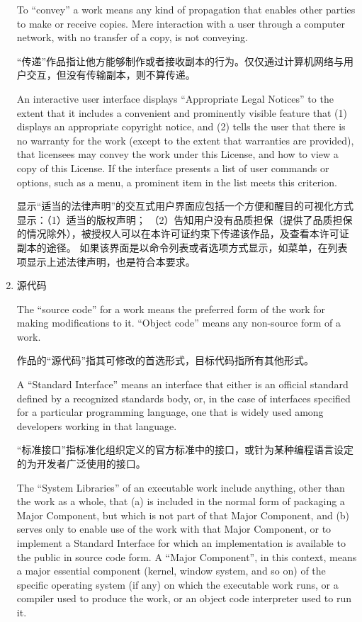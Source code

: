 \documentclass[11pt]{article}
\begin{document}
\begin{enumerate}
        To ``convey'' a work means any kind of propagation that enables other
        parties to make or receive copies.  Mere interaction with a user through
        a computer network, with no transfer of a copy, is not conveying.

        “传递”作品指让他方能够制作或者接收副本的行为。仅仅通过计算机网络与用户交互，但没有传输副本，则不算传递。

        An interactive user interface displays ``Appropriate Legal Notices''
        to the extent that it includes a convenient and prominently visible
        feature that (1) displays an appropriate copyright notice, and (2)
        tells the user that there is no warranty for the work (except to the
        extent that warranties are provided), that licensees may convey the
        work under this License, and how to view a copy of this License.  If
        the interface presents a list of user commands or options, such as a
        menu, a prominent item in the list meets this criterion.

        显示“适当的法律声明”的交互式用户界面应包括一个方便和醒目的可视化方式显示：（1）适当的版权声明；
        （2）告知用户没有品质担保（提供了品质担保的情况除外），被授权人可以在本许可证约束下传递该作品，及查看本许可证副本的途径。
        如果该界面是以命令列表或者选项方式显示，如菜单，在列表项显示上述法律声明，也是符合本要求。


  \item 源代码

        The ``source code'' for a work means the preferred form of the work
        for making modifications to it.  ``Object code'' means any non-source
        form of a work.

        作品的“源代码”指其可修改的首选形式，目标代码指所有其他形式。

        A ``Standard Interface'' means an interface that either is an official
        standard defined by a recognized standards body, or, in the case of
        interfaces specified for a particular programming language, one that
        is widely used among developers working in that language.

        “标准接口”指标准化组织定义的官方标准中的接口，或针为某种编程语言设定的为开发者广泛使用的接口。

        The ``System Libraries'' of an executable work include anything, other
        than the work as a whole, that (a) is included in the normal form of
        packaging a Major Component, but which is not part of that Major
        Component, and (b) serves only to enable use of the work with that
        Major Component, or to implement a Standard Interface for which an
        implementation is available to the public in source code form.  A
        ``Major Component'', in this context, means a major essential component
        (kernel, window system, and so on) of the specific operating system
        (if any) on which the executable work runs, or a compiler used to
        produce the work, or an object code interpreter used to run it.


\end{enumerate}
\end{document}

